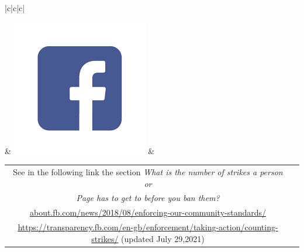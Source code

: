 \documentclass{article}
\begin{document}
\begin{landscape}
\begin{table}[p]
\begin{tabular}{|c|c|c|}
% 

 & \includegraphics[scale=0.05]{./img/fb_logo.png} & \begin{tabular}[c]{@{}cl@{}} See in the following link the section {\it What is the number of strikes a person or } \\ { \it Page has to get to before you ban them?} \\  \href{https://about.fb.com/news/2018/08/enforcing-our-community-standards/}{about.fb.com/news/2018/08/enforcing-our-community-standards/} \\ \href{https://transparency.fb.com/en-gb/enforcement/taking-action/counting-strikes/}{https://transparency.fb.com/en-gb/enforcement/taking-action/counting-strikes/} (updated July 29,2021)   \end{tabular}                            \\  

\end{tabular}
\end{table}
\end{landscape}
\end{document}
